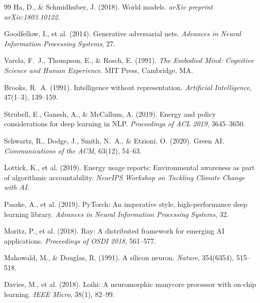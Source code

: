 \documentclass[12pt,a4paper]{article}
\begin{document}
\begin{thebibliography}{99}
Ha, D., \& Schmidhuber, J. (2018).
World models.
\textit{arXiv preprint arXiv:1803.10122}.

Goodfellow, I., et al. (2014).
Generative adversarial nets.
\textit{Advances in Neural Information Processing Systems}, 27.


Varela, F.~J., Thompson, E., \& Rosch, E. (1991).
\textit{The Embodied Mind: Cognitive Science and Human Experience}.
MIT Press, Cambridge, MA.

Brooks, R.~A. (1991).
Intelligence without representation.
\textit{Artificial Intelligence}, 47(1--3), 139--159.


Strubell, E., Ganesh, A., \& McCallum, A. (2019).
Energy and policy considerations for deep learning in NLP.
\textit{Proceedings of ACL 2019}, 3645--3650.

Schwartz, R., Dodge, J., Smith, N.~A., \& Etzioni, O. (2020).
Green AI.
\textit{Communications of the ACM}, 63(12), 54--63.

Lottick, K., et al. (2019).
Energy usage reports: Environmental awareness as part of algorithmic
accountability.
\textit{NeurIPS Workshop on Tackling Climate Change with AI}.


Paszke, A., et al. (2019).
PyTorch: An imperative style, high-performance deep learning library.
\textit{Advances in Neural Information Processing Systems}, 32.

Moritz, P., et al. (2018).
Ray: A distributed framework for emerging AI applications.
\textit{Proceedings of OSDI 2018}, 561--577.


Mahowald, M., \& Douglas, R. (1991).
A silicon neuron.
\textit{Nature}, 354(6354), 515--518.

Davies, M., et al. (2018).
Loihi: A neuromorphic manycore processor with on-chip learning.
\textit{IEEE Micro}, 38(1), 82--99.


\end{thebibliography}
\end{document}
